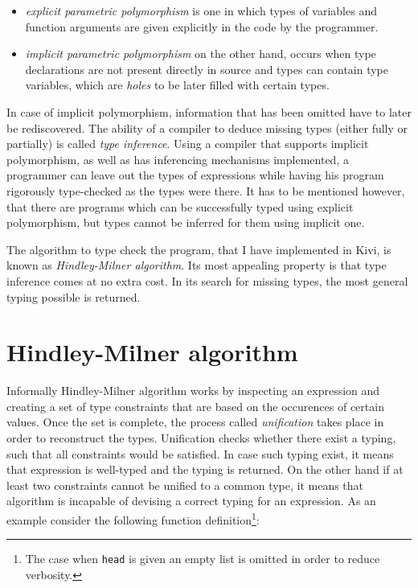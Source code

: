\documentclass[12pt,a4paper]{report}
\begin{document}
\begin{itemize}
  \item \textit{explicit parametric polymorphism} is one in which types of
    variables and function arguments are given explicitly in the code by the
    programmer.
  \item \textit{implicit parametric polymorphism} on the other hand, occurs
    when type declarations are not present directly in source and types can
    contain type variables, which are \textit{holes} to be later filled with certain
    types.
\end{itemize}

In case of implicit polymorphism, information that has been omitted have to
later be rediscovered. The ability of a compiler to deduce missing types
(either fully or partially) is called \textit{type inference}. Using a compiler
that supports implicit polymorphism, as well as has inferencing mechanisms
implemented, a programmer can leave out the types of expressions while having
his program rigorously type-checked as the types were there. It has to be
mentioned however, that there are programs which can be successfully typed
using explicit polymorphism, but types cannot be inferred for them using
implicit one.

The algorithm to type check the program, that I have implemented in Kivi, is
known as \textit{Hindley-Milner algorithm}. Its most appealing property is that
type inference comes at no extra cost. In its search for missing types, the
most general typing possible is returned.

\section{Hindley-Milner algorithm}
Informally Hindley-Milner algorithm works by inspecting an expression and
creating a set of type constraints that are based on the occurences of certain
values. Once the set is complete, the process called \textit{unification} takes
place in order to reconstruct the types. Unification checks whether there exist
a typing, such that all constraints would be satisfied. In case such typing
exist, it means that expression is well-typed and the typing is returned.  On
the other hand if at least two constraints cannot be unified to a common type,
it means that algorithm is incapable of devising a correct typing for an
expression. As an example consider the following function
definition\footnote{The case when \texttt{head} is given an empty list is
omitted in order to reduce verbosity.}:
\end{document}
